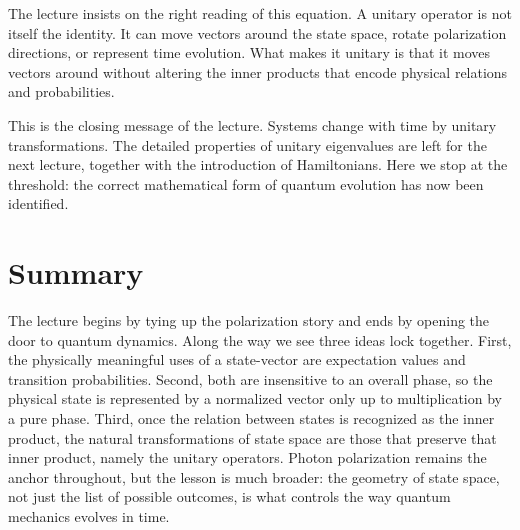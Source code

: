 The lecture insists on the right reading of this equation. A unitary operator is not itself the identity. It can move vectors around the state space, rotate polarization directions, or represent time evolution. What makes it unitary is that it moves vectors around without altering the inner products that encode physical relations and probabilities.

This is the closing message of the lecture. Systems change with time by unitary transformations. The detailed properties of unitary eigenvalues are left for the next lecture, together with the introduction of Hamiltonians. Here we stop at the threshold: the correct mathematical form of quantum evolution has now been identified.

\section{Summary}

The lecture begins by tying up the polarization story and ends by opening the door to quantum dynamics. Along the way we see three ideas lock together. First, the physically meaningful uses of a state-vector are expectation values and transition probabilities. Second, both are insensitive to an overall phase, so the physical state is represented by a normalized vector only up to multiplication by a pure phase. Third, once the relation between states is recognized as the inner product, the natural transformations of state space are those that preserve that inner product, namely the unitary operators. Photon polarization remains the anchor throughout, but the lesson is much broader: the geometry of state space, not just the list of possible outcomes, is what controls the way quantum mechanics evolves in time.